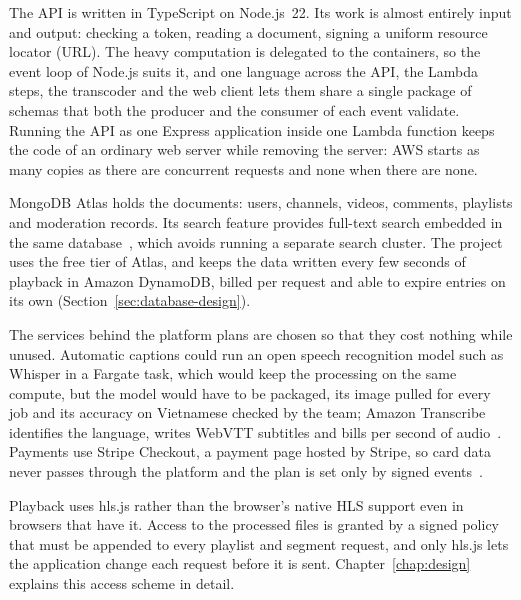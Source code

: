 The API is written in TypeScript on Node.js~22. Its work is almost entirely input and output:
checking a token, reading a document, signing a uniform resource locator (URL). The heavy computation is delegated to the
containers, so the event loop of Node.js suits it, and one language across the API, the Lambda
steps, the transcoder and the web client lets them share a single package of schemas that both the
producer and the consumer of each event validate. Running the API as one Express application inside
one Lambda function keeps the code of an ordinary web server while removing the server: AWS starts
as many copies as there are concurrent requests and none when there are none.

MongoDB Atlas holds the documents: users, channels, videos, comments, playlists and moderation
records. Its search feature provides full-text search embedded in the same database~\cite{mongodbsearch},
which avoids running a separate search cluster. The project uses the free tier of Atlas, and keeps
the data written every few seconds of playback in Amazon DynamoDB, billed per request and able to
expire entries on its own (Section~\ref{sec:database-design}).

The services behind the platform plans are chosen so that they cost nothing while unused. Automatic
captions could run an open speech recognition model such as Whisper in a Fargate task, which would
keep the processing on the same compute, but the model would have to be packaged, its image pulled for
every job and its accuracy on Vietnamese checked by the team; Amazon Transcribe identifies the
language, writes WebVTT subtitles and bills per second of audio~\cite{awstranscribe}. Payments use
Stripe Checkout, a payment page hosted by Stripe, so card data never passes through the platform and
the plan is set only by signed events~\cite{stripecheckout}.

Playback uses hls.js rather than the browser's native HLS support even in browsers that have it.
Access to the processed files is granted by a signed policy that must be appended to every playlist
and segment request, and only hls.js lets the application change each request before it is sent.
Chapter~\ref{chap:design} explains this access scheme in detail.
